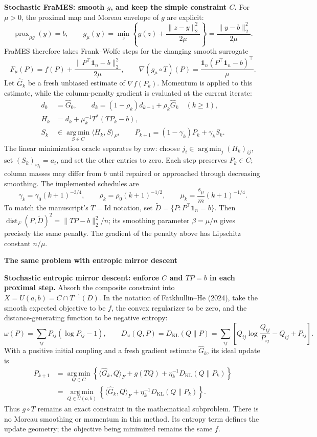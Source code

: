 \documentclass[11pt,a4paper]{article}
\newcommand{\one}{\mathbf{1}}
\newcommand{\KL}{D_{\mathrm{KL}}}
\newcommand{\ip}[2]{\langle #1,#2\rangle_F}
\newcommand{\argmin}{\operatorname*{arg\,min}}
\begin{document}
\textbf{Stochastic FraMES: smooth $g$, and keep the simple constraint $C$.}
For $\mu>0$, the proximal map and Moreau envelope of $g$ are explicit:
\[
 \operatorname{prox}_{\mu g}(y)=b,\qquad
 g_\mu(y)=\min_z\left\{g(z)+\frac{\|z-y\|_2^2}{2\mu}\right\}
         =\frac{\|y-b\|_2^2}{2\mu}.
\]
FraMES therefore takes Frank--Wolfe steps for the changing smooth surrogate
\[
 F_\mu(P)=f(P)+\frac{\|P^\top\one_n-b\|_2^2}{2\mu},\qquad
 \nabla(g_\mu\circ T)(P)=\frac{\one_n(P^\top\one_n-b)^\top}{\mu}.
\]
Let $\widehat G_k$ be a fresh unbiased estimate of $\nabla f(P_k)$. Momentum is applied to this estimate, while the column-penalty gradient is evaluated at the current iterate:
\begin{align*}
 d_0&=\widehat G_0,\qquad
 d_k=(1-\rho_k)d_{k-1}+\rho_k\widehat G_k\quad(k\geq1),\\
 H_k&=d_k+\mu_k^{-1}T^*(TP_k-b),\\
 S_k&\in\argmin_{S\in C}\ip{H_k}{S},\qquad
 P_{k+1}=(1-\gamma_k)P_k+\gamma_kS_k.
\end{align*}
The linear minimization oracle separates by row: choose
$j_i\in\argmin_j(H_k)_{ij}$, set $(S_k)_{i j_i}=a_i$, and set the other entries to zero. Each step preserves $P_k\in C$; column masses may differ from $b$ until repaired or approached through decreasing smoothing. The implemented schedules are
\[
 \gamma_k=\gamma_0(k+1)^{-3/4},\qquad
 \rho_k=\rho_0(k+1)^{-1/2},\qquad
 \mu_k=\frac{s_\mu}{m}(k+1)^{-1/4}.
\]
{\small To match the manuscript's $T=\mathrm{Id}$ notation, set
$\widetilde D=\{P:P^\top\one_n=b\}$. Then
$\operatorname{dist}_F(P,\widetilde D)^2=\|TP-b\|_2^2/n$;
its smoothing parameter $\beta=\mu/n$ gives precisely the same penalty. The gradient of the penalty above has Lipschitz constant $n/\mu$.}

\newpage
{\color{ink}\fontsize{16}{19}\selectfont\bfseries The same problem with entropic mirror descent\par}
\vspace{4pt}

\textbf{Stochastic entropic mirror descent: enforce $C$ and $TP=b$ in each proximal step.}
Absorb the composite constraint into $X=U(a,b)=C\cap T^{-1}(D)$. In the notation of Fatkhullin--He (2024), take the smooth expected objective to be $f$, the convex regularizer to be zero, and the distance-generating function to be negative entropy:
\[
 \omega(P)=\sum_{ij}P_{ij}(\log P_{ij}-1),\qquad
 D_\omega(Q,P)=\KL(Q\|P)
 =\sum_{ij}\left[Q_{ij}\log\frac{Q_{ij}}{P_{ij}}-Q_{ij}+P_{ij}\right].
\]
With a positive initial coupling and a fresh gradient estimate $\widehat G_k$, its ideal update is
\begin{align*}
 P_{k+1}
 &=\argmin_{Q\in C}\left\{\ip{\widehat G_k}{Q}+g(TQ)
                       +\eta_k^{-1}\KL(Q\|P_k)\right\}\\
 &=\boxed{\argmin_{Q\in U(a,b)}
          \left\{\ip{\widehat G_k}{Q}+\eta_k^{-1}\KL(Q\|P_k)\right\}.}
\end{align*}
Thus $g\circ T$ remains an exact constraint in the mathematical subproblem. There is no Moreau smoothing or momentum in this method. Its entropy term defines the update geometry; the objective being minimized remains the same $f$.
\end{document}
